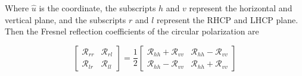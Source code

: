 \documentclass[draftcls,onecolumn]{IEEEtran}  %
\begin{document}
Where $\hat{u}$ is the coordinate, the subscripts $h$ and $v$ represent the horizontal and vertical plane, and the subscripts $r$ and $l$ represent the RHCP and LHCP plane. Then the Fresnel reflection coefficients of the circular polarization are

\begin{equation}
	\begin{bmatrix}
	\mathcal{R}_{rr} & \mathcal{R}_{rl} \\
	\mathcal{R}_{lr} & \mathcal{R}_{ll}
	\end{bmatrix} = 
	\frac{1}{2}
	\begin{bmatrix}
	\mathcal{R}_{hh} + \mathcal{R}_{vv} & \mathcal{R}_{hh} - \mathcal{R}_{vv} \\
	\mathcal{R}_{hh} - \mathcal{R}_{vv} & \mathcal{R}_{hh} + \mathcal{R}_{vv}		\end{bmatrix}
\end{equation}
\end{document}

